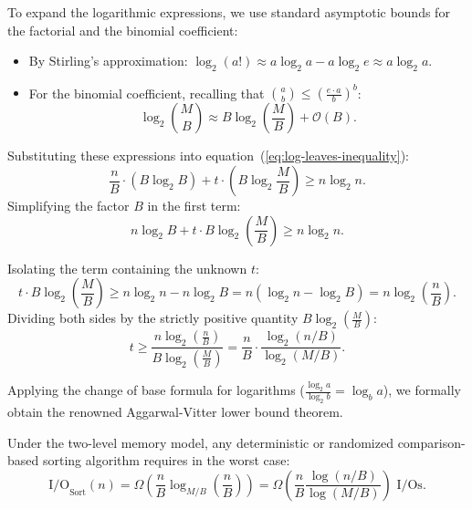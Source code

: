 To expand the logarithmic expressions, we use standard asymptotic bounds for the factorial and the binomial coefficient:
\begin{itemize}
  \item By Stirling's approximation: $\log_2(a!) \approx a \log_2 a - a \log_2 e \approx a \log_2 a$.
  \item For the binomial coefficient, recalling that $\binom{a}{b} \le \left(\frac{e \cdot a}{b}\right)^b$:
  \begin{equation}
    \log_2 \binom{M}{B} \approx B \log_2\left(\frac{M}{B}\right) + \mathcal{O}(B).
  \end{equation}
\end{itemize}

Substituting these expressions into equation~(\ref{eq:log-leaves-inequality}):
\begin{equation}
  \frac{n}{B} \cdot \left(B \log_2 B\right) + t \cdot \left(B \log_2 \frac{M}{B}\right) \ge n \log_2 n.
\end{equation}
Simplifying the factor $B$ in the first term:
\begin{equation}
  n \log_2 B + t \cdot B \log_2\left(\frac{M}{B}\right) \ge n \log_2 n.
\end{equation}

Isolating the term containing the unknown $t$:
\begin{equation}
  t \cdot B \log_2\left(\frac{M}{B}\right) \ge n \log_2 n - n \log_2 B = n \left(\log_2 n - \log_2 B\right) = n \log_2\left(\frac{n}{B}\right).
\end{equation}
Dividing both sides by the strictly positive quantity $B \log_2\left(\frac{M}{B}\right)$:
\begin{equation}
  t \ge \frac{n \log_2\left(\frac{n}{B}\right)}{B \log_2\left(\frac{M}{B}\right)} = \frac{n}{B} \cdot \frac{\log_2(n / B)}{\log_2(M / B)}.
\end{equation}

Applying the change of base formula for logarithms ($\frac{\log_2 a}{\log_2 b} = \log_b a$), we formally obtain the renowned Aggarwal-Vitter lower bound theorem.

\begin{theorem}
\label{thm:aggarwal-vitter-bound}
Under the two-level memory model, any deterministic or randomized comparison-based sorting algorithm requires in the worst case:
\begin{equation}
  \text{I/O}_{\text{Sort}}(n) = \Omega\left(\frac{n}{B} \log_{M/B}\left(\frac{n}{B}\right)\right) = \Omega\left(\frac{n}{B} \frac{\log(n / B)}{\log(M / B)}\right) \text{ I/Os}.
\end{equation}
\end{theorem}

